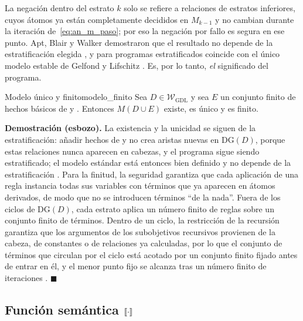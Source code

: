 La negación dentro del estrato $k$ solo se refiere a relaciones de estratos inferiores, cuyos átomos ya están completamente decididos en $M_{k-1}$ y no cambian durante la iteración de~\eqref{eq:an_m_paso}; por eso la negación por fallo es segura en ese punto. Apt, Blair y Walker demostraron que el resultado no depende de la estratificación elegida \cite{AptBlairWalker1988}, y para programas estratificados coincide con el único modelo estable de Gelfond y Lifschitz \cite{GelfondLifschitz1988}. Es, por lo tanto, \emph{el} significado del programa.

\begin{proposicion}{Modelo único y finito}{modelo_finito}
Sea $D \in \mathcal W_{\mathrm{GDL}}$ y sea $E$ un conjunto finito de hechos básicos de  y . Entonces $M(D \cup E)$ existe, es único y es finito.
\end{proposicion}

\noindent\textbf{Demostración (esbozo).} La existencia y la unicidad se siguen de la estratificación: añadir hechos de  y  no crea aristas nuevas en $\mathrm{DG}(D)$, porque estas relaciones nunca aparecen en cabezas, y el programa sigue siendo estratificado; el modelo estándar está entonces bien definido y no depende de la estratificación \cite{AptBlairWalker1988}. Para la finitud, la seguridad garantiza que cada aplicación de una regla instancia todas sus variables con términos que ya aparecen en átomos derivados, de modo que no se introducen términos ``de la nada''. Fuera de los ciclos de $\mathrm{DG}(D)$, cada estrato aplica un número finito de reglas sobre un conjunto finito de términos. Dentro de un ciclo, la restricción de la recursión garantiza que los argumentos de los subobjetivos recursivos provienen de la cabeza, de constantes o de relaciones ya calculadas, por lo que el conjunto de términos que circulan por el ciclo está acotado por un conjunto finito fijado antes de entrar en él, y el menor punto fijo se alcanza tras un número finito de iteraciones \cite{Love2008GDL}. \hfill $\blacksquare$

\subsection{Función semántica \texorpdfstring{$[\![\cdot]\!]$}{[[.]]}}

